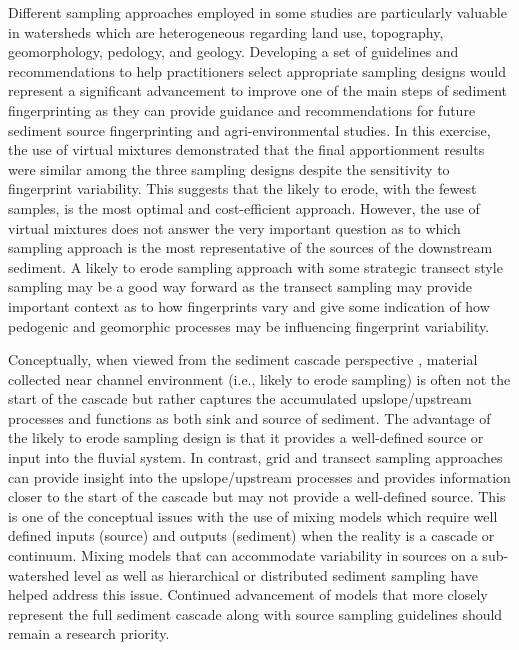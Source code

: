 \documentclass[
  number]{elsarticle}
\begin{document}
Different sampling approaches employed in some studies
\citep[e.g.,][]{boudreault2019} are particularly valuable in watersheds
which are heterogeneous regarding land use, topography, geomorphology,
pedology, and geology. Developing a set of guidelines and
recommendations to help practitioners select appropriate sampling
designs would represent a significant advancement to improve one of the
main steps of sediment fingerprinting as they can provide guidance and
recommendations for future sediment source fingerprinting and
agri-environmental studies. In this exercise, the use of virtual
mixtures demonstrated that the final apportionment results were similar
among the three sampling designs despite the sensitivity to fingerprint
variability. This suggests that the likely to erode, with the fewest
samples, is the most optimal and cost-efficient approach. However, the
use of virtual mixtures does not answer the very important question as
to which sampling approach is the most representative of the sources of
the downstream sediment. A likely to erode sampling approach with some
strategic transect style sampling may be a good way forward as the
transect sampling may provide important context as to how fingerprints
vary and give some indication of how pedogenic and geomorphic processes
may be influencing fingerprint variability.

Conceptually, when viewed from the sediment cascade perspective
\citep{burt2010}, material collected near channel environment (i.e.,
likely to erode sampling) is often not the start of the cascade but
rather captures the accumulated upslope/upstream processes and functions
as both sink and source of sediment. The advantage of the likely to
erode sampling design is that it provides a well-defined source or input
into the fluvial system. In contrast, grid and transect sampling
approaches can provide insight into the upslope/upstream processes and
provides information closer to the start of the cascade but may not
provide a well-defined source. This is one of the conceptual issues with
the use of mixing models which require well defined inputs (source) and
outputs (sediment) when the reality is a cascade or continuum. Mixing
models that can accommodate variability in sources on a sub-watershed
level as well as hierarchical or distributed sediment sampling
\citep[e.g.,][]{vale2016, blake2018} have helped address this issue.
Continued advancement of models that more closely represent the full
sediment cascade along with source sampling guidelines should remain a
research priority.
\end{document}
